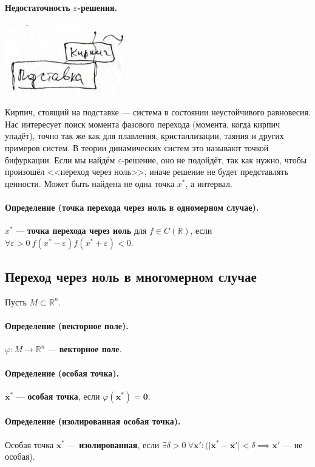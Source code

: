 \paragraph{Недостаточность $\varepsilon$-решения.}
\begin{center}
	\includegraphics[width=5.2cm]{../figures/lection_1/figure_1.png}
\end{center}
Кирпич, стоящий на подставке --- система в состоянии неустойчивого равновесия. Нас интересует поиск момента фазового перехода (момента, когда кирпич упадёт), точно так же как для плавления, кристаллизации, таяния и других примеров систем. В теории динамических систем это называют точкой бифуркации. Если мы найдём $\varepsilon$-решение, оно не подойдёт, так как нужно, чтобы произошёл <<переход через ноль>>, иначе решение не будет представлять ценности. Может быть найдена не одна точка $x^*$, а интервал.
\paragraph{Определение (точка перехода через ноль в одномерном случае).} $x^*$ --- \textbf{точка перехода через ноль} для $f\in C(\mathbb{R})$, если $\forall \varepsilon > 0 \  f(x^*-\varepsilon)f(x^*+\varepsilon) < 0$.
\subsection{Переход через ноль в многомерном случае}
Пусть $M \subset \mathbb{R}^n$.
\paragraph{Определение (векторное поле).} $\varphi:M\rightarrow\mathbb{R}^n$ --- \textbf{векторное поле}.
\paragraph{Определение (особая точка).} $\mathbf{x}^*$ --- \textbf{особая точка}, если $\varphi(\mathbf{x}^*)=\mathbf{0}$.
\paragraph{Определение (изолированная особая точка).} Особая точка $\mathbf{x}^*$ --- \textbf{изолированная}, если $\exists \delta > 0 \  \forall \mathbf{x'}: (\vert\mathbf{x}^*-\mathbf{x'}\vert<\delta \implies \mathbf{x'}$ --- не особая).

